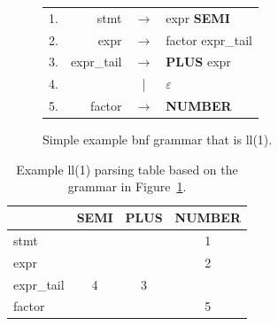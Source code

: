 \begin{figure}[H]
\centering
\begin{table}[H]
\centering
\begin{tabular}{l|rcl}
1. & stmt       & $\rightarrow$ & expr \textbf{SEMI}			\\
2. & expr       & $\rightarrow$ & factor expr\_tail			\\
3. & expr\_tail & $\rightarrow$ & \textbf{PLUS} expr			\\
4. &            & |             & $\varepsilon$					\\
5. & factor     & $\rightarrow$ & \textbf{NUMBER}          
\end{tabular}
\label{tab:example-bfn-ll}
\end{table}
\caption{Simple example \gls{bnf} grammar that is \gls{ll}(1).}
\end{figure}

\begin{table}[H]
  \centering
  \begin{tabular}{|l|c|c|c|}
\hline
              &\textbf{SEMI}  &\textbf{PLUS}  &\textbf{NUMBER}  \\
\hline
  stmt        &               &               &1                \\
\hline
  expr        &               &               &2                \\
\hline
  expr\_tail  &4              &3              &                 \\
\hline
  factor      &               &               &5                \\
\hline
  \end{tabular}
  \caption{Example \gls{ll}(1) parsing table based on the grammar in Figure~\ref{tab:example-bfn-ll}.}
  \label{tab:example-ll-table}
\end{table}

